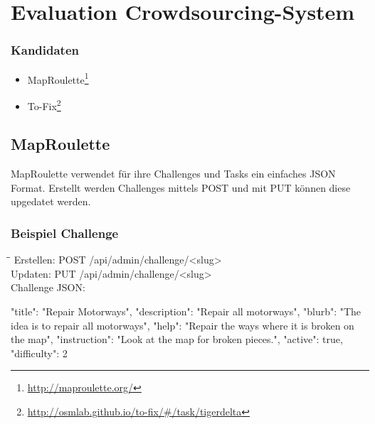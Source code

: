 \newpage
\section{Evaluation Crowdsourcing-System}
\label{sec:crowdsourcing}
\subsubsection{Kandidaten}
\begin{itemize}
	\item MapRoulette\footnote{\url{http://maproulette.org/}} 
	\item To-Fix\footnote{\url{http://osmlab.github.io/to-fix/\#/task/tigerdelta}}
\end{itemize}

\subsection{MapRoulette}
\label{subsec:MapRoulette}
\Gls{MapRoulette} verwendet für ihre Challenges und Tasks ein einfaches JSON Format. Erstellt werden Challenges mittels POST und mit PUT können diese upgedatet werden.

\subsubsection{Beispiel Challenge}
\begin{tabbing}
    \hspace*{4cm}\=\hspace*{5cm}\= \kill
    Erstellen: \> POST /api/admin/challenge/<slug>  \\
    Updaten: \> PUT /api/admin/challenge/<slug> \\
    Challenge JSON: \\
\end{tabbing}		
\begin{python}
{
  "title": "Repair Motorways",
  "description": "Repair all motorways",
  "blurb": "The idea is to repair all motorways",
  "help": "Repair the ways where it is broken on the map",
  "instruction": "Look at the map for broken pieces.",
  "active": true,
  "difficulty": 2
}
\end{python}
\newpage
